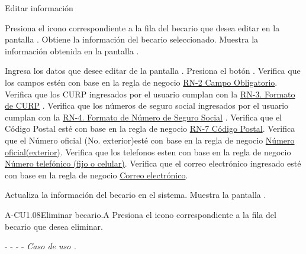 	\begin{UCtrayectoria}{Editar información }

	     \UCpaso[\UCactor] Presiona el icono \faEdit correspondiente a la fila del becario que desea editar en la pantalla .
		\UCpaso[\UCsist] Obtiene la información del becario seleccionado.
		\UCpaso[\UCsist] Muestra la información obtenida en la pantalla . 

		\UCpaso[\UCactor] Ingresa los datos que desee editar de la pantalla .
		\UCpaso[\UCactor] Presiona el botón . 
		\UCpaso[\UCsist] Verifica que los campos estén con base en la regla de negocio \hyperlink{RN2}{RN-2 Campo Obligatorio}. 
		\UCpaso[\UCsist] Verifica que los CURP ingresados por el usuario cumplan con la \hyperlink{RN3}{RN-3. Formato de CURP} . 
		\UCpaso[\UCsist] Verifica que los números de seguro social ingresados por el usuario cumplan con la \hyperlink{RN4}{RN-4. Formato de Número de Seguro Social} . 
		\UCpaso[\UCsist] Verifica que el Código Postal esté con base en la regla de negocio \hyperlink{RN7}{RN-7 C\'odigo Postal}. 
		\UCpaso[\UCsist] Verifica que el Número oficial (No. exterior)esté con base en la regla de negocio \hyperlink{RN12}{Número oficial(exterior)}. 
		\UCpaso[\UCsist] Verifica que los telefonos esten con base en la regla de negocio \hyperlink{RN10}{Número telefónico (fijo o celular)}. 
		\UCpaso[\UCsist] Verifica que el correo electrónico ingresado esté con base en la regla de negocio \hyperlink{RN13}{Correo electrónico}. 
		
        \UCpaso[\UCsist] Actualiza la información del becario en el sistema.
	    \UCpaso[\UCsist] Muestra la pantalla .
	
	\end{UCtrayectoria}
	

	

	
	

\begin{UCtrayectoriaA}{A-CU1.08}{Eliminar becario.}{A}
	     \UCpaso[\UCactor]Presiona el icono \faTrashO  correspondiente a la fila del becario que desea eliminar.
	     
	    \item[- -] - - {\em Caso de uso .}
	\end{UCtrayectoriaA}

